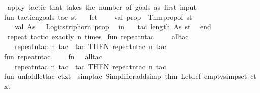 \begin{isabellebody}
\isanewline
{\isacharparenleft}{\kern0pt}{\isacharasterisk}{\kern0pt}\ apply\ tactic\ that\ takes\ the\ number\ of\ goals\ as\ first\ input\ {\isacharasterisk}{\kern0pt}{\isacharparenright}{\kern0pt}\isanewline
fun\ tactic{\isacharunderscore}{\kern0pt}ngoals\ tac\ st\ {\isacharequal}{\kern0pt}\isanewline
\ \ let\ \isanewline
\ \ \ val\ prop\ {\isacharequal}{\kern0pt}\ Thm{\isachardot}{\kern0pt}prop{\isacharunderscore}{\kern0pt}of\ st{\isacharsemicolon}{\kern0pt}\isanewline
\ \ \ val\ {\isacharparenleft}{\kern0pt}As{\isacharcomma}{\kern0pt}\ {\isacharunderscore}{\kern0pt}{\isacharparenright}{\kern0pt}\ {\isacharequal}{\kern0pt}\ Logic{\isachardot}{\kern0pt}strip{\isacharunderscore}{\kern0pt}horn\ prop\isanewline
\ \ in\isanewline
\ \ \ tac\ {\isacharparenleft}{\kern0pt}length\ As{\isacharparenright}{\kern0pt}\ st\isanewline
\ \ end\isanewline
\isanewline
{\isacharparenleft}{\kern0pt}{\isacharasterisk}{\kern0pt}\ repeat\ tactic\ exactly\ n\ times\ {\isacharasterisk}{\kern0pt}{\isacharparenright}{\kern0pt}\isanewline
fun\ repeat{\isacharunderscore}{\kern0pt}n{\isacharunderscore}{\kern0pt}tac\ {}\ {\isacharunderscore}{\kern0pt}\ \ {\isacharequal}{\kern0pt}\ all{\isacharunderscore}{\kern0pt}tac\isanewline
\ \ {\isacharbar}{\kern0pt}\ repeat{\isacharunderscore}{\kern0pt}n{\isacharunderscore}{\kern0pt}tac\ n\ tac\ {\isacharequal}{\kern0pt}\ tac\ THEN\ repeat{\isacharunderscore}{\kern0pt}n{\isacharunderscore}{\kern0pt}tac\ {\isacharparenleft}{\kern0pt}n{\isacharminus}{\kern0pt}{}{\isacharparenright}{\kern0pt}\ tac\isanewline
\isanewline
fun\ repeat{\isacharunderscore}{\kern0pt}n{\isacharunderscore}{\kern0pt}tac{\isacharprime}{\kern0pt}\ {}\ {\isacharunderscore}{\kern0pt}\ \ {\isacharequal}{\kern0pt}\ {\isacharparenleft}{\kern0pt}fn\ {\isacharunderscore}{\kern0pt}\ {\isacharequal}{\kern0pt}{\isachargreater}{\kern0pt}\ all{\isacharunderscore}{\kern0pt}tac{\isacharparenright}{\kern0pt}\isanewline
\ \ {\isacharbar}{\kern0pt}\ repeat{\isacharunderscore}{\kern0pt}n{\isacharunderscore}{\kern0pt}tac{\isacharprime}{\kern0pt}\ n\ tac\ {\isacharequal}{\kern0pt}\ tac\ THEN{\isacharprime}{\kern0pt}\ repeat{\isacharunderscore}{\kern0pt}n{\isacharunderscore}{\kern0pt}tac{\isacharprime}{\kern0pt}\ {\isacharparenleft}{\kern0pt}n{\isacharminus}{\kern0pt}{}{\isacharparenright}{\kern0pt}\ tac\isanewline
\isanewline
fun\ unfold{\isacharunderscore}{\kern0pt}let{\isacharunderscore}{\kern0pt}tac\ ctxt\ {\isacharequal}{\kern0pt}\ simp{\isacharunderscore}{\kern0pt}tac\ {\isacharparenleft}{\kern0pt}Simplifier{\isachardot}{\kern0pt}add{\isacharunderscore}{\kern0pt}simp\ {\isacharat}{\kern0pt}{\isacharbraceleft}{\kern0pt}thm\ Let{\isacharunderscore}{\kern0pt}def{\isacharbraceright}{\kern0pt}\ {\isacharparenleft}{\kern0pt}empty{\isacharunderscore}{\kern0pt}simpset\ ctxt{\isacharparenright}{\kern0pt}{\isacharparenright}{\kern0pt}\isanewline

\end{isabellebody}
